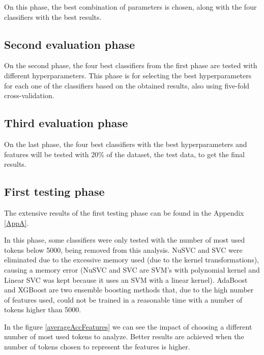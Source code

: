 \documentclass[journal]{IEEEtran}
\begin{document}
On this phase, the best combination of parameters is chosen, along with the four classifiers with the best results.

\subsection{Second evaluation phase}

On the second phase, the four best classifiers from the first phase are tested with different hyperparameters. This phase is for selecting the best hyperparameters for each one of the classifiers based on the obtained results, also using five-fold cross-validation.

\subsection{Third evaluation phase}

On the last phase, the four best classifiers with the best hyperparameters and features will be tested with 20\% of the dataset, the test data, to get the final results.

\subsection{First testing phase}

The extensive results of the first testing phase can be found in the Appendix \ref{AppA}.

In this phase, some classifiers were only tested with the number of most used tokens below 5000, being removed from this analysis. NuSVC and SVC were eliminated due to the excessive memory used (due to the kernel transformations), causing a memory error (NuSVC and SVC are SVM's with polynomial kernel and Linear SVC was kept because it uses an SVM with a linear kernel). AdaBoost and XGBoost are two ensemble boosting methods that, due to the high number of features used, could not be trained in a reasonable time with a number of tokens higher than 5000.

In the figure \ref{averageAccFeatures} we can see the impact of choosing a different number of most used tokens to analyze. Better results are achieved when the number of tokens chosen to represent the features is higher.
\end{document}
